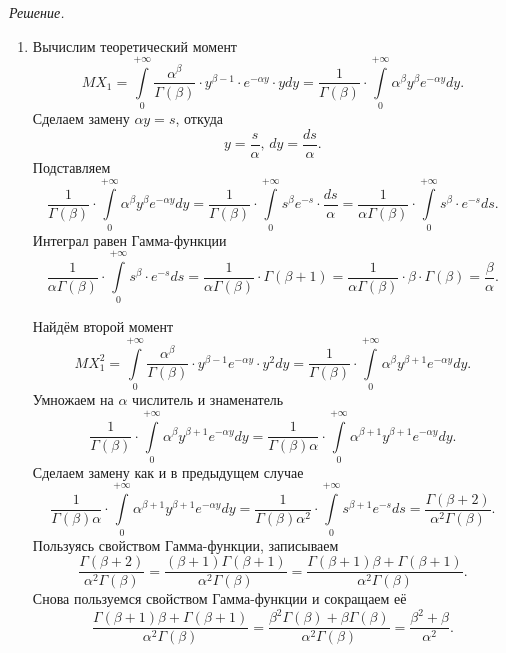 \textit{Решение.}
\begin{enumerate}[label=\alph*)]
  \item Вычислим теоретический момент
  $$MX_1 =
    \int \limits_0^{+ \infty }
      \frac{ \alpha^{ \beta }}{ \Gamma \left( \beta \right) } \cdot
      y^{ \beta - 1} \cdot e^{- \alpha y} \cdot y
    dy =
    \frac{1}{ \Gamma \left( \beta \right) } \cdot
    \int \limits_0^{+ \infty } \alpha^{ \beta } y^{ \beta } e^{- \alpha y} dy.$$
  Сделаем замену $ \alpha y = s$, откуда
  $$y = \frac{s}{ \alpha }, \,
    dy = \frac{ds}{ \alpha }.$$
  Подставляем
  $$ \frac{1}{ \Gamma \left( \beta \right) } \cdot
    \int \limits_0^{+ \infty } \alpha^{ \beta } y^{ \beta } e^{- \alpha y} dy =
    \frac{1}{ \Gamma \left( \beta \right) } \cdot
    \int \limits_0^{+ \infty } s^{ \beta } e^{-s} \cdot \frac{ds}{ \alpha } =
    \frac{1}{ \alpha \Gamma \left( \beta \right) } \cdot
    \int \limits_0^{+ \infty } s^{ \beta } \cdot e^{-s} ds.$$
  Интеграл равен Гамма-функции
  $$ \frac{1}{ \alpha \Gamma \left( \beta \right) } \cdot
    \int \limits_0^{+ \infty } s^{ \beta } \cdot e^{-s} ds =
    \frac{1}{ \alpha \Gamma \left( \beta \right) } \cdot \Gamma \left( \beta + 1 \right) =
    \frac{1}{ \alpha \Gamma \left( \beta \right) } \cdot \beta \cdot \Gamma \left( \beta \right) =
    \frac{ \beta }{ \alpha }.$$

  Найдём второй момент
  $$MX_1^2 =
    \int \limits_0^{+ \infty }
      \frac{ \alpha^{ \beta }}{ \Gamma \left( \beta \right) } \cdot
      y^{ \beta - 1} e^{- \alpha y} \cdot y^2
    dy =
    \frac{1}{ \Gamma \left( \beta \right) } \cdot
    \int \limits_0^{+ \infty } \alpha^{ \beta } y^{ \beta + 1} e^{- \alpha y} dy.$$
  Умножаем на $ \alpha $ числитель и знаменатель
  $$ \frac{1}{ \Gamma \left( \beta \right) } \cdot
    \int \limits_0^{+ \infty } \alpha^{ \beta } y^{ \beta + 1} e^{- \alpha y} dy =
    \frac{1}{ \Gamma \left( \beta \right) \alpha } \cdot
    \int \limits_0^{+ \infty } \alpha^{ \beta + 1} y^{ \beta + 1} e^{- \alpha y} dy.$$
  Сделаем замену как и в предыдущем случае
  $$ \frac{1}{ \Gamma \left( \beta \right) \alpha } \cdot
    \int \limits_0^{+ \infty } \alpha^{ \beta + 1} y^{ \beta + 1} e^{- \alpha y} dy =
    \frac{1}{ \Gamma \left( \beta \right) \alpha^2} \cdot
    \int \limits_0^{+ \infty } s^{ \beta + 1} e^{-s} ds =
    \frac{ \Gamma \left( \beta + 2 \right) }{ \alpha^2 \Gamma \left( \beta \right) }.$$
  Пользуясь свойством Гамма-функции, записываем
  $$ \frac{ \Gamma \left( \beta + 2 \right) }{ \alpha^2 \Gamma \left( \beta \right) } =
    \frac{ \left( \beta + 1 \right) \Gamma \left( \beta + 1 \right) }{ \alpha^2 \Gamma \left( \beta \right) } =
    \frac{ \Gamma \left( \beta + 1 \right) \beta + \Gamma \left( \beta + 1 \right) }{ \alpha^2 \Gamma \left( \beta \right) }.$$
  Снова пользуемся свойством Гамма-функции и сокращаем её
  $$ \frac{ \Gamma \left( \beta + 1 \right) \beta + \Gamma \left( \beta + 1 \right) }{ \alpha^2 \Gamma \left( \beta \right) } =
    \frac{ \beta^2 \Gamma \left( \beta \right) + \beta \Gamma \left( \beta \right) }{ \alpha^2 \Gamma \left( \beta \right) } =
    \frac{ \beta^2 + \beta }{ \alpha^2}.$$


\end{enumerate}
